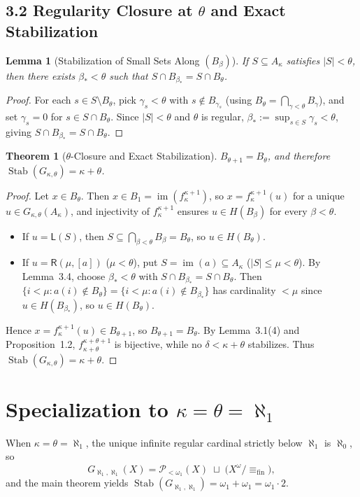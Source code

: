\documentclass[11pt,a4paper]{article}
\theoremstyle{definition}
\theoremstyle{plain}
\newtheorem{lemma}[definition]{Lemma}
\newtheorem{theorem}[definition]{Theorem}
\newcommand{\Stab}{\operatorname{Stab}}
\newcommand{\im}{\operatorname{im}}
\begin{document}
\subsection*{3.2 Regularity Closure at $\theta$ and Exact Stabilization}

\begin{lemma}[Stabilization of Small Sets Along $(B_\beta)$]
If $S \subseteq A_\kappa$ satisfies $|S| < \theta$, then there exists $\beta_* < \theta$ such that $S \cap B_{\beta_*} = S \cap B_\theta$.
\end{lemma}

\begin{proof}
For each $s \in S \setminus B_\theta$, pick $\gamma_s < \theta$ with $s \notin B_{\gamma_s}$ (using $B_\theta = \bigcap_{\gamma<\theta} B_\gamma$), and set $\gamma_s = 0$ for $s \in S \cap B_\theta$. Since $|S| < \theta$ and $\theta$ is regular, $\beta_* := \sup_{s \in S} \gamma_s < \theta$, giving $S \cap B_{\beta_*} = S \cap B_\theta$.
\end{proof}

\begin{theorem}[$\theta$-Closure and Exact Stabilization]
$B_{\theta+1} = B_\theta$, and therefore $\Stab(G_{\kappa,\theta}) = \kappa + \theta$.
\end{theorem}

\begin{proof}
Let $x \in B_\theta$. Then $x \in B_1 = \im(f_\kappa^{\kappa+1})$, so $x = f_\kappa^{\kappa+1}(u)$ for a unique $u \in G_{\kappa,\theta}(A_\kappa)$, and injectivity of $f_\kappa^{\kappa+1}$ ensures $u \in H(B_\beta)$ for every $\beta < \theta$.
\begin{itemize}[leftmargin=2em]
  \item If $u = \mathsf{L}(S)$, then $S \subseteq \bigcap_{\beta < \theta} B_\beta = B_\theta$, so $u \in H(B_\theta)$.
  \item If $u = \mathsf{R}(\mu, [a])$ ($\mu < \theta$), put $S = \im(a) \subseteq A_\kappa$ ($|S| \le \mu < \theta$). By Lemma~3.4, choose $\beta_* < \theta$ with $S \cap B_{\beta_*} = S \cap B_\theta$. Then $\{i < \mu : a(i) \notin B_\theta\} = \{i < \mu : a(i) \notin B_{\beta_*}\}$ has cardinality $< \mu$ since $u \in H(B_{\beta_*})$, so $u \in H(B_\theta)$.
\end{itemize}
Hence $x = f_\kappa^{\kappa+1}(u) \in B_{\theta+1}$, so $B_{\theta+1} = B_\theta$. By Lemma~3.1(4) and Proposition~1.2, $f_{\kappa+\theta}^{\kappa+\theta+1}$ is bijective, while no $\delta < \kappa + \theta$ stabilizes. Thus $\Stab(G_{\kappa,\theta}) = \kappa + \theta$.
\end{proof}

\section{Specialization to $\kappa = \theta = \aleph_1$}

When $\kappa = \theta = \aleph_1$, the unique infinite regular cardinal strictly below $\aleph_1$ is $\aleph_0$, so
\[
  G_{\aleph_1, \aleph_1}(X) = \mathcal{P}_{<\omega_1}(X) \;\sqcup\; \bigl(X^\omega / {\equiv_{\mathrm{fin}}}\bigr),
\]
and the main theorem yields $\Stab(G_{\aleph_1, \aleph_1}) = \omega_1 + \omega_1 = \omega_1 \cdot 2$.
\end{document}
